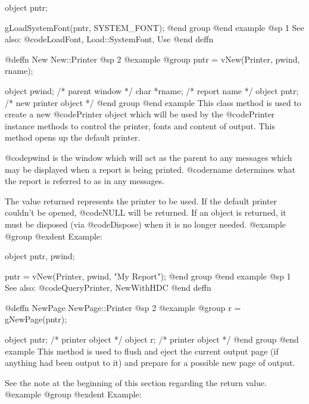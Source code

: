 object  pntr;

gLoadSystemFont(pntr, SYSTEM_FONT);
@end group
@end example
@sp 1
See also:  @code{LoadFont, Load::SystemFont, Use}
@end deffn

















@deffn {New} New::Printer
@sp 2
@example
@group
pntr = vNew(Printer, pwind, rname); 

object  pwind;  /*  parent window       */
char    *rname; /*  report name         */
object  pntr;   /*  new printer object  */
@end group
@end example
This class method is used to create a new @code{Printer} object which
will be used by the @code{Printer} instance methods to control the
printer, fonts and content of output.  This method opens up the
default printer.

@code{pwind} is the window which will act as the parent to any
messages which may be displayed when a report is being printed.
@code{rname} determines what the report is referred to as in any
messages.

The value returned represents the printer to be used.  If the default
printer couldn't be opened, @code{NULL} will be returned.  If an object
is returned, it must be disposed (via @code{Dispose}) when it is no
longer needed.
@example
@group
@exdent Example:

object  pntr, pwind;

pntr = vNew(Printer, pwind, "My Report");
@end group
@end example
@sp 1
See also:  @code{QueryPrinter, NewWithHDC}
@end deffn











@deffn {NewPage} NewPage::Printer
@sp 2
@example
@group
r = gNewPage(pntr); 

object  pntr;   /*  printer object  */
object  r;      /*  printer object  */
@end group
@end example
This method is used to flush and eject the current output page (if anything
had been output to it) and prepare for a possible new page of output.

See the note at the beginning of this section regarding the return value.
@example
@group
@exdent Example:

